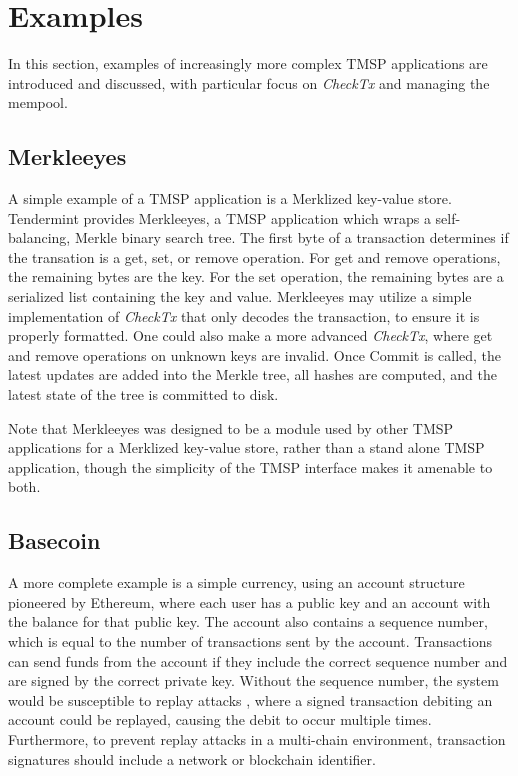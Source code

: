\section{Examples}

In this section, examples of increasingly more complex TMSP applications are introduced and discussed,
with particular focus on \emph{CheckTx} and managing the mempool.

\subsection{Merkleeyes}

A simple example of a TMSP application is a Merklized key-value store. 
Tendermint provides Merkleeyes, a TMSP application which wraps a self-balancing, Merkle binary search tree.
The first byte of a transaction determines if the transation is a get, set, or remove operation. 
For get and remove operations, the remaining bytes are the key. 
For the set operation, the remaining bytes are a serialized list containing the key and value.
Merkleeyes may utilize a simple implementation of \emph{CheckTx} that only decodes the transaction,
to ensure it is properly formatted.
One could also make a more advanced \emph{CheckTx}, where get and remove operations on unknown keys are invalid.
Once Commit is called, the latest updates are added into the Merkle tree, all hashes are computed, 
and the latest state of the tree is committed to disk.

Note that Merkleeyes was designed to be a module used by other TMSP applications for a Merklized key-value store,
rather than a stand alone TMSP application, though the simplicity of the TMSP interface makes it amenable to both.

\subsection{Basecoin}

A more complete example is a simple currency, 
using an account structure pioneered by Ethereum, 
where each user has a public key and an account with the balance for that public key.
The account also contains a sequence number, which is equal to the number of transactions sent by the account.
Transactions can send funds from the account if they include the correct sequence number
and are signed by the correct private key.
Without the sequence number, the system would be susceptible to replay attacks \cite{replay},
where a signed transaction debiting an account could be replayed, 
causing the debit to occur multiple times.
Furthermore, to prevent replay attacks in a multi-chain environment, 
transaction signatures should include a network or blockchain identifier.

